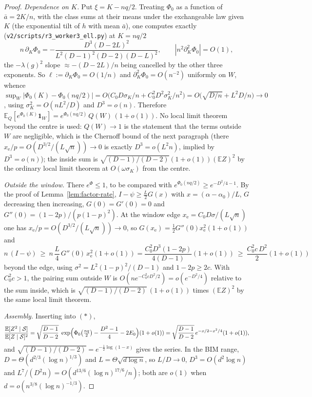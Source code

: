 \documentclass[11pt]{article}
\newcommand{\EE}{\mathbb{E}}
\begin{document}
\begin{proof}
\emph{Dependence on \(K\).}  Put \(\xi=K-nq/2\).  Treating \(\Phi_0\) as a function of \(\bar a=2K/n\), with the class
sums at their means under the exchangeable law given \(K\) (the exponential tilt of \(h\) with mean \(\bar a\)), one computes
exactly (\texttt{v2/scripts/r3\_worker3\_ell.py}) at \(K=nq/2\)
\[
n\,\partial_K\Phi_0=-\frac{D^3(D-2L)^2}{L^2(D-1)^2(D-2)(D-L)^2},\qquad |n^2\partial_K^2\Phi_0|=O(1),
\]
the \(-\lambda(g)^2\) slope \(\approx-(D-2L)/n\) being cancelled by the other three exponents.  So
\(\ell:=\partial_K\Phi_0=O(1/n)\) and \(\partial_K^2\Phi_0=O(n^{-2})\) uniformly on \(W\), whence
\(\sup_W\lvert\Phi_0(K)-\Phi_0(nq/2)\rvert=O\bigl(C_0D\sigma_K/n+C_0^2D^2\sigma_K^2/n^2\bigr)
=O\bigl(\sqrt{D/n}+L^2D/n\bigr)\to0\), using \(\sigma_K^2=O(nL^2/D)\) and \(D^3=o(n)\).  Therefore
\(\EE_Q[e^{\Phi_0(K)}\mathbf 1_W]=e^{\Phi_0(nq/2)}\,Q(W)\,(1+o(1))\).  No local limit theorem beyond the centre is used:
\(Q(W)\to1\) is the statement that the terms outside \(W\) are negligible, which is the Chernoff bound of the next paragraph
(there \(x_{\mathrm e}/p=O(D^{3/2}/(L\sqrt n))\to0\) is exactly \(D^3=o(L^2n)\), implied by \(D^3=o(n)\)); the inside sum is
\(\sqrt{(D-1)/(D-2)}(1+o(1))(\EE Z)^2\) by the ordinary local limit theorem at \(O(\omega\sigma_K)\) from the centre.

\emph{Outside the window.} There \(e^{\Phi}\le1\), to be compared with
\(e^{\Phi_0(nq/2)}\ge e^{-D^2/4-1}\). By the proof of
Lemma~\ref{lem:factor-rate}, \(I-\psi\ge\tfrac L2G(x)\) with
\(x=(\alpha-\alpha_0)/L\), \(G\) decreasing then increasing,
\(G(0)=G'(0)=0\) and \(G''(0)=(1-2p)/(p(1-p)^2)\). At the window edge
\(x_{\mathrm e}=C_0D\sigma/(L\sqrt n)\) one has \(x_{\mathrm e}/p=O(D^{3/2}/(L\sqrt n))\to0\),
so \(G(x_{\mathrm e})=\tfrac12G''(0)x_{\mathrm e}^2(1+o(1))\) and
\[
n\,(I-\psi)\ \ge\ n\,\frac L4\,G''(0)\,x_{\mathrm e}^2(1+o(1))
=\frac{C_0^2D^3(1-2p)}{4(D-1)}(1+o(1))\ \ge\ \frac{C_0^2c\,D^2}{2}(1+o(1))
\]
beyond the edge, using \(\sigma^2=L^2(1-p)^2/(D-1)\) and \(1-2p\ge2c\).
With \(C_0^2c>1\), the pairing sum outside \(W\) is
\(O(ne^{-C_0^2cD^2/2})=o(e^{-D^2/4})\) relative to the sum inside, which is
\(\sqrt{(D-1)/(D-2)}\,(1+o(1))\) times \((\EE Z)^2\) by the same local limit
theorem.

\emph{Assembly.} Inserting into \((\ast)\),
\[
\frac{\EE[Z^2\mid\mathcal S]}{\EE[Z\mid\mathcal S]^2}
=
\sqrt{\frac{D-1}{D-2}}\;
\exp\Bigl(\Phi_0\bigl(\tfrac{nq}2\bigr)-\frac{D^2-1}{4}-2E_0\Bigr)(1+o(1))
=
\sqrt{\frac{D-1}{D-2}}\,e^{-x/2-x^2/4}(1+o(1)),
\]
and \(\sqrt{(D-1)/(D-2)}=e^{-\frac12\log(1-x)}\) gives the series.
In the BIM range, \(D=\Theta(d^{2/3}(\log n)^{1/3})\) and
\(L=\Theta\sqrt{d\log n}\), so \(L/D\to0\), \(D^3=O(d^2\log n)\) and
\(L^7/(D^2n)=O(d^{13/6}(\log n)^{17/6}/n)\); both are \(o(1)\) when
\(d=o(n^{3/8}(\log n)^{-1/3})\).
\end{proof}
\end{document}
